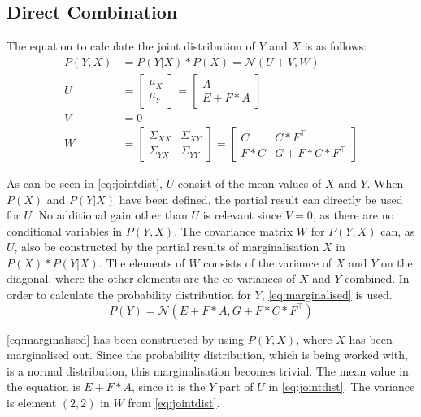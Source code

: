 \subsection{Direct Combination}\label{section:direct-combination}
The equation to calculate the joint distribution of $Y$ and $X$ is as follows:
\begin{equation}\label{eq:jointdist}
\begin{aligned}
P(Y,X)&=P(Y|X)*P(X)=\mathcal{N}(U+V,W)\\
U&= 
\begin{bmatrix}
\mu_X \\
\mu_Y 
\end{bmatrix}
= \begin{bmatrix}
A \\
E + F * A
\end{bmatrix}\\
V &= 0\\
W &=
\begin{bmatrix}
\Sigma_{XX} & \Sigma_{XY} \\
\Sigma_{YX} & \Sigma_{YY}
\end{bmatrix}
=
\begin{bmatrix}
C & C * F^\intercal \\
F*C & G + F * C * F^\intercal
\end{bmatrix}
\end{aligned}
\end{equation}

As can be seen in \eqref{eq:jointdist}, $U$ consist of the mean values of $X$ and $Y$.
When $P(X)$ and $P(Y|X)$ have been defined, the partial result can directly be used for $U$.
No additional gain other than $U$ is relevant since $V=0$, as there are no conditional variables in $P(Y,X)$.
The covariance matrix $W$ for $P(Y,X)$ can, as $U$, also be constructed by the partial results of marginalisation $X$ in $P(X)*P(Y|X)$.
The elements of $W$ consists of the variance of $X$ and $Y$ on the diagonal, where the other elements are the co-variances of $X$ and $Y$ combined.
In order to calculate the probability distribution for $Y$, \eqref{eq:marginalised} is used.
\begin{equation}\label{eq:marginalised}
P(Y)=\mathcal{N}(E+F*A,G+F*C*F^\intercal)
\end{equation}

\eqref{eq:marginalised} has been constructed by using $P(Y,X)$, where $X$ has been marginalised out. 
Since the probability distribution, which is being worked with, is a normal distribution, this
marginalisation becomes trivial.
The mean value in the equation is $E+F*A$, since it is the $Y$ part of $U$ in \eqref{eq:jointdist}.
The variance is element $(2,2)$ in $W$ from \eqref{eq:jointdist}.

